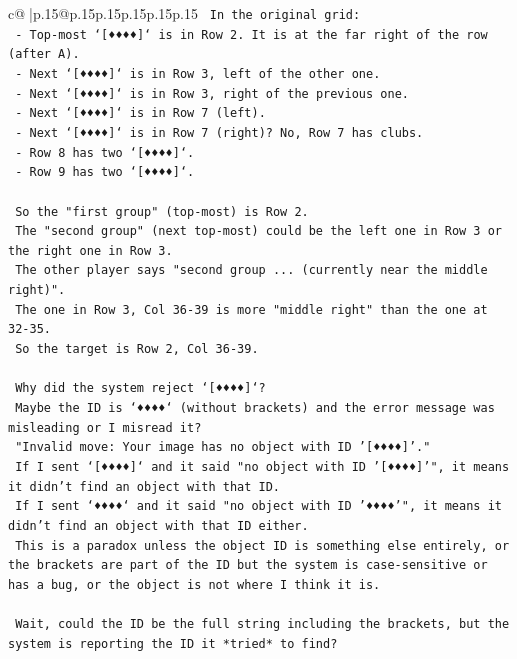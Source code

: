 \documentclass{article}
\begin{document}
{\begin{supertabular}{c@{$\;$}|p{.15\linewidth}@{}p{.15\linewidth}p{.15\linewidth}p{.15\linewidth}p{.15\linewidth}p{.15\linewidth}}
{{{\texttt{    In the original grid:} \\
\texttt{    {-} Top{-}most `{[}♦♦♦♦{]}` is in Row 2. It is at the far right of the row (after A).} \\
\texttt{    {-} Next `{[}♦♦♦♦{]}` is in Row 3, left of the other one.} \\
\texttt{    {-} Next `{[}♦♦♦♦{]}` is in Row 3, right of the previous one.} \\
\texttt{    {-} Next `{[}♦♦♦♦{]}` is in Row 7 (left).} \\
\texttt{    {-} Next `{[}♦♦♦♦{]}` is in Row 7 (right)? No, Row 7 has clubs.} \\
\texttt{    {-} Row 8 has two `{[}♦♦♦♦{]}`.} \\
\texttt{    {-} Row 9 has two `{[}♦♦♦♦{]}`.} \\
\\ 
\texttt{    So the "first group" (top{-}most) is Row 2.} \\
\texttt{    The "second group" (next top{-}most) could be the left one in Row 3 or the right one in Row 3.} \\
\texttt{    The other player says "second group ... (currently near the middle right)".} \\
\texttt{    The one in Row 3, Col 36{-}39 is more "middle right" than the one at 32{-}35.} \\
\texttt{    So the target is Row 2, Col 36{-}39.} \\
\\ 
\texttt{    Why did the system reject `{[}♦♦♦♦{]}`?} \\
\texttt{    Maybe the ID is `♦♦♦♦` (without brackets) and the error message was misleading or I misread it?} \\
\texttt{    "Invalid move: Your image has no object with ID '{[}♦♦♦♦{]}'."} \\
\texttt{    If I sent `{[}♦♦♦♦{]}` and it said "no object with ID '{[}♦♦♦♦{]}'", it means it didn't find an object with that ID.} \\
\texttt{    If I sent `♦♦♦♦` and it said "no object with ID '♦♦♦♦'", it means it didn't find an object with that ID either.} \\
\texttt{    This is a paradox unless the object ID is something else entirely, or the brackets are part of the ID but the system is case{-}sensitive or has a bug, or the object is not where I think it is.} \\
\\ 
\texttt{    Wait, could the ID be the full string including the brackets, but the system is reporting the ID it *tried* to find?} \\
}}}
\end{supertabular}}
\end{document}

